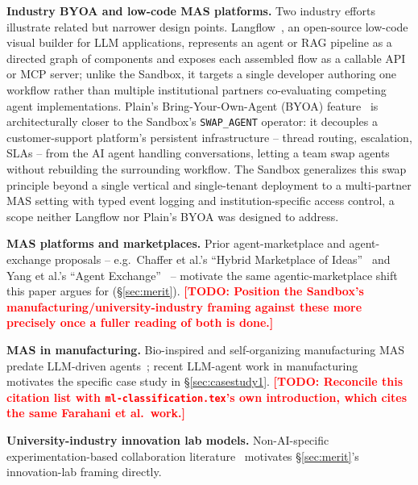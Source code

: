 \documentclass[10pt,conference]{IEEEtran}
\newcommand{\todo}[1]{\textcolor{red}{\textbf{[TODO: #1]}}}
\begin{document}
\textbf{Industry BYOA and low-code MAS platforms.} Two industry efforts
illustrate related but narrower design points. Langflow~\cite{langflow2026},
an open-source low-code visual builder for LLM applications, represents an
agent or RAG pipeline as a directed graph of components and exposes each
assembled flow as a callable API or MCP server; unlike the Sandbox, it
targets a single developer authoring one workflow rather than multiple
institutional partners co-evaluating competing agent implementations.
Plain's Bring-Your-Own-Agent (BYOA) feature~\cite{plain2026byoa} is
architecturally closer to the Sandbox's \texttt{SWAP\_AGENT} operator: it
decouples a customer-support platform's persistent infrastructure --
thread routing, escalation, SLAs -- from the AI agent handling
conversations, letting a team swap agents without rebuilding the
surrounding workflow. The Sandbox generalizes this swap principle beyond a
single vertical and single-tenant deployment to a multi-partner MAS setting
with typed event logging and institution-specific access control, a scope
neither Langflow nor Plain's BYOA was designed to address.

\textbf{MAS platforms and marketplaces.} Prior agent-marketplace and
agent-exchange proposals -- e.g.\ Chaffer et al.'s ``Hybrid Marketplace of
Ideas''~\cite{chaffer2025hybridmarketplaceideas} and Yang et al.'s ``Agent
Exchange''~\cite{yang2025agentexchangeshapingfuture} -- motivate the same
agentic-marketplace shift this paper argues for (\S\ref{sec:merit}).
\todo{Position the Sandbox's manufacturing/university-industry framing
against these more precisely once a fuller reading of both is done.}

\textbf{MAS in manufacturing.} Bio-inspired and self-organizing
manufacturing MAS predate LLM-driven
agents~\cite{Barbosa2010,Leitao2012,Bussmann2004}; recent LLM-agent work in
manufacturing~\cite{Farahani_2026} motivates the specific case study in
\S\ref{sec:casestudy1}. \todo{Reconcile this citation list with
\texttt{ml-classification.tex}'s own introduction, which cites the same
Farahani et al.\ work.}

\textbf{University-industry innovation lab models.} Non-AI-specific
experimentation-based collaboration
literature~\cite{criado2018introduction,garciaarteagoitia2024experimentation,hargadon2003breakthroughs}
motivates \S\ref{sec:merit}'s innovation-lab framing directly.

\end{document}
